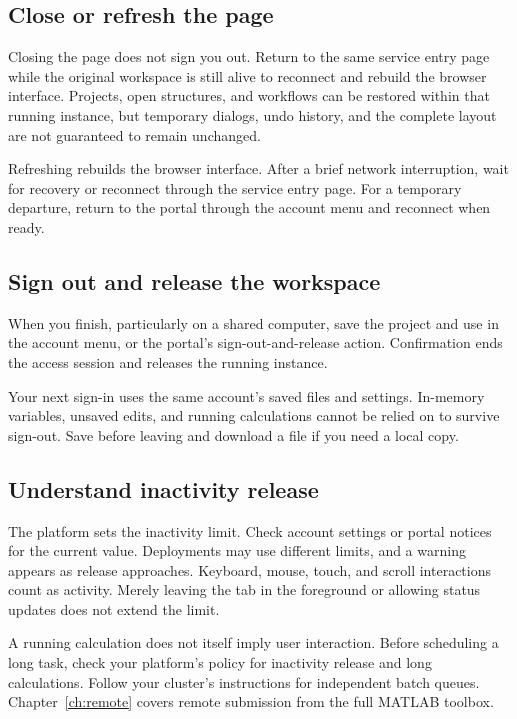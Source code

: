 \subsection{Close or refresh the page}

Closing the page does not sign you out. Return to the same service entry page while the original workspace is still alive to reconnect and rebuild the browser interface. Projects, open structures, and workflows can be restored within that running instance, but temporary dialogs, undo history, and the complete layout are not guaranteed to remain unchanged.

Refreshing rebuilds the browser interface. After a brief network interruption, wait for recovery or reconnect through the service entry page. For a temporary departure, return to the portal through the account menu and reconnect when ready.

\subsection{Sign out and release the workspace}

When you finish, particularly on a shared computer, save the project and use  in the account menu, or the portal's sign-out-and-release action. Confirmation ends the access session and releases the running instance.

Your next sign-in uses the same account's saved files and settings. In-memory variables, unsaved edits, and running calculations cannot be relied on to survive sign-out. Save before leaving and download a file if you need a local copy.

\subsection{Understand inactivity release}

The platform sets the inactivity limit. Check account settings or portal notices for the current value. Deployments may use different limits, and a warning appears as release approaches. Keyboard, mouse, touch, and scroll interactions count as activity. Merely leaving the tab in the foreground or allowing status updates does not extend the limit.

A running calculation does not itself imply user interaction. Before scheduling a long task, check your platform's policy for inactivity release and long calculations. Follow your cluster's instructions for independent batch queues. Chapter~\ref{ch:remote} covers remote submission from the full MATLAB\regmark{} toolbox.

